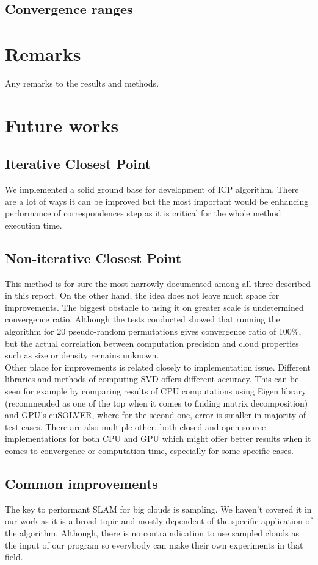 \documentclass[titlepage]{article}
\begin{document}
\subsection{Convergence ranges}

\section{Remarks}
Any remarks to the results and methods.

\section{Future works}

\subsection{Iterative Closest Point}
We implemented a solid ground base for development of ICP algorithm. There are a lot of ways it can be improved but the most important would be enhancing performance of correspondences step as it is critical for the whole method execution time. 

\subsection{Non-iterative Closest Point}
This method is for sure the most narrowly documented among all three described in this report. On the other hand, the idea does not leave much space for improvements. The biggest obstacle to using it on greater scale is undetermined convergence ratio. Although the tests conducted showed that running the algorithm for 20 pseudo-random permutations gives convergence ratio of 100\%, but the actual correlation between computation precision and cloud properties such as size or density remains unknown.\\
Other place for improvements is related closely to implementation issue. Different libraries and methods of computing SVD offers different accuracy. This can be seen for example by comparing results of CPU computations using Eigen library (recommended as one of the top when it comes to finding matrix decomposition) and GPU's cuSOLVER, where for the second one, error is smaller in majority of test cases. There are also multiple other, both closed and open source implementations for both CPU and GPU which might offer better results when it comes to convergence or computation time, especially for some specific cases.

\subsection{Common improvements}
The key to performant SLAM for big clouds is sampling. We haven't covered it in our work as it is a broad topic and mostly dependent of the specific application of the algorithm. Although, there is no contraindication to use sampled clouds as the input of our program so everybody can make their own experiments in that field.

\newpage
\printbibliography
\end{document}
